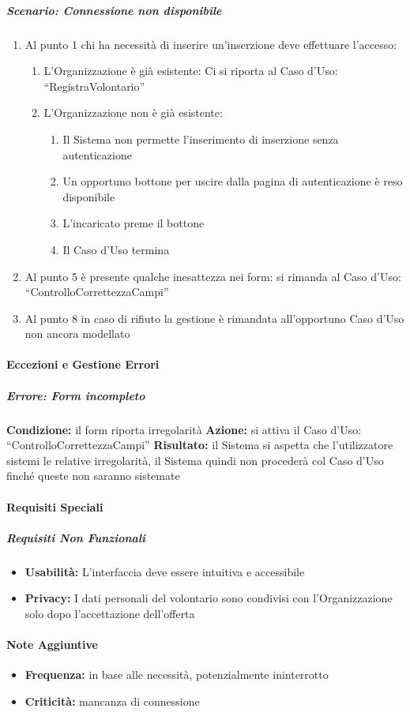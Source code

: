 \subparagraph{Scenario: Connessione non disponibile}
\begin{enumerate}
    \item Al punto 1 chi ha necessità di inserire un'inserzione deve effettuare l'accesso:
    \begin{enumerate}
        \item L'Organizzazione è già esistente: Ci si riporta al Caso d'Uso: ``RegistraVolontario''
        \item L'Organizzazione non è già esistente:
        \begin{enumerate}
            \item Il Sistema non permette l'inserimento di inserzione senza autenticazione
            \item Un opportuno bottone per uscire dalla pagina di autenticazione è reso disponibile
            \item L'incaricato preme il bottone
            \item Il Caso d'Uso termina
        \end{enumerate}
    \end{enumerate}
    \item Al punto 5 è presente qualche inesattezza nei form: si rimanda al Caso d'Uso: ``ControlloCorrettezzaCampi''
    \item Al punto 8 in caso di rifiuto la gestione è rimandata all'opportuno Caso d'Uso non ancora modellato
\end{enumerate}

\paragraph{Eccezioni e Gestione Errori}

\subparagraph{Errore: Form incompleto}
\textbf{Condizione:} il form riporta irregolarità
\textbf{Azione:} si attiva il Caso d'Uso: ``ControlloCorrettezzaCampi''
\textbf{Risultato:} il Sistema si aspetta che l'utilizzatore sistemi le relative irregolarità, il Sistema quindi non procederà col Caso d'Uso finché queste non saranno sistemate

\paragraph{Requisiti Speciali}

\subparagraph{Requisiti Non Funzionali}
\begin{itemize}
    \item \textbf{Usabilità:} L'interfaccia deve essere intuitiva e accessibile
    \item \textbf{Privacy:} I dati personali del volontario sono condivisi con l'Organizzazione solo dopo l'accettazione dell'offerta
\end{itemize}

\paragraph{Note Aggiuntive}
\begin{itemize}
    \item \textbf{Frequenza:} in base alle necessità, potenzialmente ininterrotto
    \item \textbf{Criticità:} mancanza di connessione
\end{itemize}